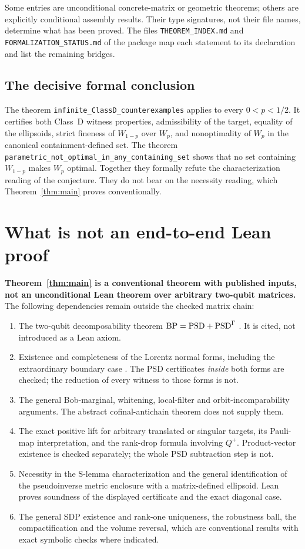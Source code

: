 Some entries are unconditional concrete-matrix or geometric theorems; others are explicitly conditional assembly results. Their type signatures, not their file names, determine what has been proved. The files \texttt{THEOREM\_INDEX.md} and \texttt{FORMALIZATION\_STATUS.md} of the package map each statement to its declaration and list the remaining bridges.

\subsection{The decisive formal conclusion}

The theorem \texttt{infinite\_ClassD\_counterexamples} applies to every $0<p<1/2$. It certifies both Class~D witness properties, admissibility of the target, equality of the ellipsoids, strict fineness of $W_{1-p}$ over $W_p$, and nonoptimality of $W_p$ in the canonical containment-defined set. The theorem \texttt{parametric\_not\_optimal\_in\_any\_containing\_set} shows that no set containing $W_{1-p}$ makes $W_p$ optimal. Together they formally refute the characterization reading of the conjecture. They do not bear on the necessity reading, which Theorem~\ref{thm:main} proves conventionally.

\section{What is not an end-to-end Lean proof}\label{app:gaps}

\textbf{Theorem~\ref{thm:main} is a conventional theorem with published inputs, not an unconditional Lean theorem over arbitrary two-qubit matrices.} The following dependencies remain outside the checked matrix chain:

\begin{enumerate}
\item The two-qubit decomposability theorem $\mathrm{BP}=\mathrm{PSD}+\mathrm{PSD}^\Gamma$ \cite{woronowicz}. It is cited, not introduced as a Lean axiom.
\item Existence and completeness of the Lorentz normal forms, including the extraordinary boundary case \cite{avron}. The PSD certificates \emph{inside} both forms are checked; the reduction of every witness to those forms is not.
\item The general Bob-marginal, whitening, local-filter and orbit-incomparability arguments. The abstract cofinal-antichain theorem does not supply them.
\item The exact positive lift for arbitrary translated or singular targets, its Pauli-map interpretation, and the rank-drop formula involving $Q^+$. Product-vector existence is checked separately; the whole PSD subtraction step is not.
\item Necessity in the S-lemma characterization and the general identification of the pseudoinverse metric enclosure with a matrix-defined ellipsoid. Lean proves soundness of the displayed certificate and the exact diagonal case.
\item The general SDP existence and rank-one uniqueness, the robustness ball, the compactification and the volume reversal, which are conventional results with exact symbolic checks where indicated.
\end{enumerate}


